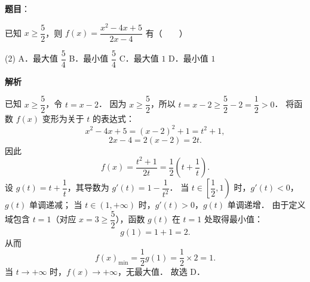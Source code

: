 \begin{answer}

\textbf{题目}：

已知 $x \geqslant \dfrac{5}{2}$，则 $f(x) = \dfrac{x^2 - 4x + 5}{2x - 4}$ 有\mbox{（　　）}

\begin{gkopts}(2)
\task A．最大值 $\dfrac{5}{4}$
\task B．最小值 $\dfrac{5}{4}$
\task C．最大值 $1$
\task D．最小值 $1$
\end{gkopts}

\textbf{解析}

已知 $x \geqslant \dfrac{5}{2}$，令 $t = x - 2$．
因为 $x \geqslant \dfrac{5}{2}$，所以 $t = x - 2 \geqslant \dfrac{5}{2} - 2 = \dfrac{1}{2} > 0$．
将函数 $f(x)$ 变形为关于 $t$ 的表达式：
\nopagebreak[4]
\[
x^2 - 4x + 5 = (x - 2)^2 + 1 = t^2 + 1,
\]
\nopagebreak[4]
\[
2x - 4 = 2(x - 2) = 2t.
\]
因此
\nopagebreak[4]
\[
f(x) = \frac{t^2 + 1}{2t} = \frac{1}{2}\left(t + \frac{1}{t}\right).
\]
设 $g(t) = t + \dfrac{1}{t}$，其导数为 $g'(t) = 1 - \dfrac{1}{t^2}$．
当 $t \in \left[\dfrac{1}{2}, 1\right)$ 时，$g'(t) < 0$，$g(t)$ 单调递减；
当 $t \in (1, +\infty)$ 时，$g'(t) > 0$，$g(t)$ 单调递增．
由于定义域包含 $t = 1$（对应 $x = 3 \geqslant \dfrac{5}{2}$），函数 $g(t)$ 在 $t = 1$ 处取得最小值：
\nopagebreak[4]
\[
g(1) = 1 + 1 = 2.
\]
从而
\nopagebreak[4]
\[
f(x)_{\min} = \frac{1}{2} g(1) = \frac{1}{2} \times 2 = 1.
\]
当 $t \to +\infty$ 时，$f(x) \to +\infty$，无最大值．
故选 D．


\end{answer}
